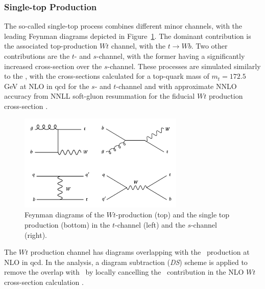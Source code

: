 \subsubsection{Single-top Production}
The so-called single-top process combines different minor channels, with the leading Feynman diagrams depicted in Figure~\ref{fig:feynstop}. The dominant contribution is the associated top-production $Wt$ channel, with the $t \rightarrow Wb$. Two other contributions are the $t$- and $s$-channel, with the former having a significantly increased cross-section over the $s$-channel. These processes are simulated similarly to the \ttb, with the cross-sections calculated for a top-quark mass of $m_t = 172.5$ GeV at NLO in \gls{qcd} for the $s$- and $t$-channel \cite{ALIEV20111034, KANT201574} and with approximate NNLO accuracy from NNLL soft-gluon resummation for the fiducial $Wt$ production cross-section \cite{PhysRevD.82.054018, kidonakis2013quark}.
\begin{figure}[h!]
  \center
  \includegraphics[width=0.7\textwidth]{Images/VH/Feynman/singletop.png}
  \caption{Feynman diagrams of the $Wt$-production (top) and the single top production (bottom) in the $t$-channel (left) and the $s$-channel (right).} 
  \label{fig:feynstop}
\end{figure}

The $Wt$ production channel has diagrams overlapping with the \ttb\ production at NLO in \gls{qcd}. In the analysis, a diagram subtraction (\textit{DS}) scheme is applied to remove the overlap with \ttb\ by locally cancelling the \ttb\ contribution in the NLO $Wt$ cross-section calculation \cite{StefanoFrixione_2008}. 

